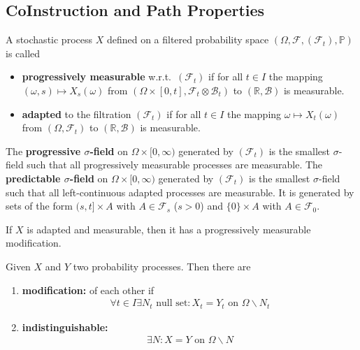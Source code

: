 \subsection{CoInstruction and Path Properties}
\begin{definition}
	A stochastic process $X$ defined on a filtered probability space $(\Omega, \mathcal{F}, (\mathcal{F}_t), \mathbb{P})$ is called
	\begin{itemize}
		\item \textbf{progressively measurable} w.r.t.\ $(\mathcal{F}_t)$ if for all $t \in I$ the mapping $(\omega, s) \mapsto X_s(\omega)$ from $(\Omega \times [0,t], \mathcal{F}_t \otimes \mathcal{B}_t)$ to $(\mathbb{R}, \mathcal{B})$ is measurable.
		\item \textbf{adapted} to the filtration $(\mathcal{F}_t)$ if for all $t \in I$ the mapping $\omega \mapsto X_t(\omega)$ from $(\Omega, \mathcal{F}_t)$ to $(\mathbb{R}, \mathcal{B})$ is measurable.
	\end{itemize}
	The \textbf{progressive $\sigma$-field} on $\Omega \times [0, \infty)$ generated by $(\mathcal{F}_t)$ is the smallest $\sigma$-field such that all progressively measurable processes are measurable.
	The \textbf{predictable $\sigma$-field} on $\Omega \times [0, \infty)$ generated by $(\mathcal{F}_t)$ is the smallest $\sigma$-field such that all left-continuous adapted processes are measurable. It is generated by sets of the form $(s, t] \times A$ with $A \in \mathcal{F}_s$ ($s > 0$) and $\{0\} \times A$ with $A \in \mathcal{F}_0$.
\end{definition}

\begin{proposition}
	If $X$ is adapted and measurable, then it has a progressively measurable modification.
\end{proposition}

\begin{definition}
Given $X$ and $Y$ two probability processes. Then there are
\begin{enumerate}
	\item \textbf{modification:} of each other if 
	\begin{align*}
		\forall t \in I \exists N_t \text{ null set}: X_t = Y_t \text{ on } \Omega \backslash N_t
	\end{align*}
	\item \textbf{indistinguishable:}
	\begin{align*}
		\exists N: X = Y \text{ on } \Omega \backslash N 
	\end{align*}
\end{enumerate}
\end{definition}


